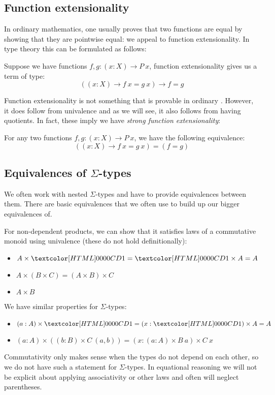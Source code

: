 \subsection{Function extensionality}

In ordinary mathematics, one usually proves that two functions are
equal by showing that they are pointwise equal: we appeal to function
extensionality. In type theory this can be formulated as follows:
\begin{definition}
  Suppose we have functions $f, g : (x : X) \to P\ x$, function
  extensionality gives us a term of type:
  $$
  ((x : X) \to f\ x = g\ x) \to f = g
  $$
\end{definition}

Function extensionality is not something that is provable in ordinary
\mltt. However, it does follow from univalence and as we will see, it
also follows from having quotients. In fact, these imply we have \emph{strong function extensionality}:

\begin{proposition}
  For any two functions $f, g : (x : X) \to P\ x$, we have the following equivalence:
  $$
  ((x : X) \to f\ x = g\ x) = (f = g)
  $$
\end{proposition}

\subsection{Equivalences of $\Sigma$-types}

We often work with nested $\Sigma$-types and have to provide
equivalences between them. There are basic equivalences that we often
use to build up our bigger equivalences of.

For non-dependent products, we can show that it satisfies laws of a
commutative monoid using univalence (these do not hold
definitionally):
\begin{itemize}
\item $A \times \unitty = \unitty \times A = A$
\item $A \times (B \times C) = (A \times B) \times C$
\item $A \times B$
\end{itemize}
We have similar properties for $\Sigma$-types:
\begin{itemize}
\item $(a : A) \times \unitty = (x : \unitty) \times A = A$
\item $(a : A) \times ((b : B) \times C\ (a , b)) = (x : (a : A) \times B\ a) \times C\ x$
\end{itemize}
Commutativity only makes sense when the types do not depend on
each other, so we do not have such a statement for $\Sigma$-types. In
equational reasoning we will not be explicit about applying
associativity or other laws and often will neglect parentheses.

